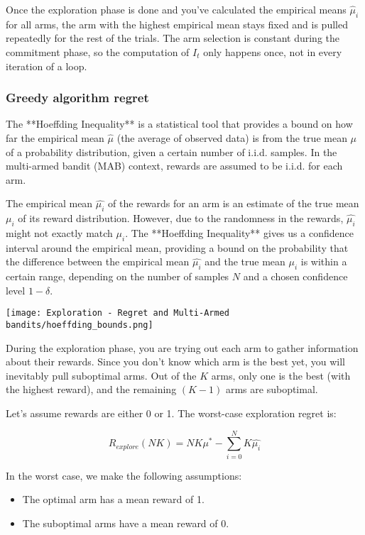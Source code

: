 Once the exploration phase is done and you've calculated the empirical means $\hat{\mu}_i$ for all arms, the arm with the highest empirical mean stays fixed and is pulled repeatedly for the rest of the trials. The arm selection is constant during the commitment phase, so the computation of $I_t$ only happens once, not in every iteration of a loop.

\subsubsection{Greedy algorithm regret}


The **Hoeffding Inequality** is a statistical tool that provides a bound on how far the empirical mean $\hat{\mu}$ (the average of observed data) is from the true mean $\mu$ of a probability distribution, given a certain number of i.i.d. samples. In the multi-armed bandit (MAB) context, rewards are assumed to be i.i.d. for each arm.

The empirical mean $\hat{\mu_i}$ of the rewards for an arm is an estimate of the true mean $\mu_i$ of its reward distribution. However, due to the randomness in the rewards, $\hat{\mu_i}$ might not exactly match $\mu_i$. The **Hoeffding Inequality** gives us a confidence interval around the empirical mean, providing a bound on the probability that the difference between the empirical mean $\hat{\mu_i}$ and the true mean $\mu_i$ is within a certain range, depending on the number of samples $N$ and a chosen confidence level $1 - \delta$.

\texttt{[image: Exploration - Regret and Multi-Armed bandits/hoeffding\_bounds.png]}

During the exploration phase, you are trying out each arm to gather information about their rewards. Since you don't know which arm is the best yet, you will inevitably pull suboptimal arms. Out of the $K$ arms, only one is the best (with the highest reward), and the remaining $(K-1)$ arms are suboptimal.

Let’s assume rewards are either 0 or 1. The worst-case exploration regret is:

$$
    R_{explore}(NK) = NK\mu^* - \sum_{i=0}^NK \hat{\mu_i}
$$

In the worst case, we make the following assumptions:
\begin{itemize}
    \item The optimal arm has a mean reward of 1.
    \item The suboptimal arms have a mean reward of 0.
\end{itemize}

